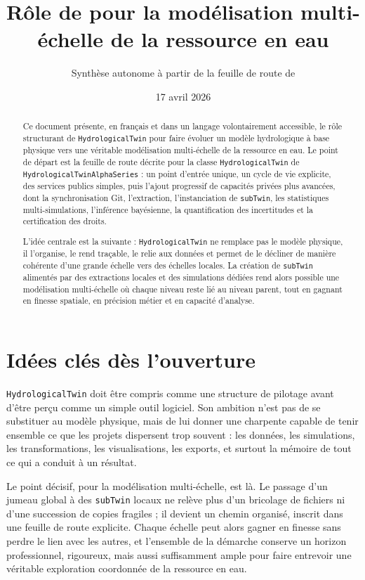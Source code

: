 \documentclass[11pt,a4paper]{article}
\title{Rôle de \hydrot{} pour la modélisation multi-échelle de la ressource en eau}
\author{Synthèse autonome à partir de la feuille de route de \alphaht{}}
\date{17 avril 2026}
\newcommand{\hydrot}{\texttt{HydrologicalTwin}}
\newcommand{\alphaht}{\texttt{HydrologicalTwinAlphaSeries}}
\begin{document}
\maketitle

\begin{abstract}
Ce document présente, en français et dans un langage volontairement accessible, le rôle structurant de \hydrot{} pour faire évoluer un modèle hydrologique à base physique vers une véritable modélisation multi-échelle de la ressource en eau. Le point de départ est la feuille de route décrite pour la classe \texttt{HydrologicalTwin} de \alphaht{} : un point d'entrée unique, un cycle de vie explicite, des services publics simples, puis l'ajout progressif de capacités privées plus avancées, dont la synchronisation Git, l'extraction, l'instanciation de \texttt{subTwin}, les statistiques multi-simulations, l'inférence bayésienne, la quantification des incertitudes et la certification des droits.

L'idée centrale est la suivante : \hydrot{} ne remplace pas le modèle physique, il l'organise, le rend traçable, le relie aux données et permet de le décliner de manière cohérente d'une grande échelle vers des échelles locales. La création de \texttt{subTwin} alimentés par des extractions locales et des simulations dédiées rend alors possible une modélisation multi-échelle où chaque niveau reste lié au niveau parent, tout en gagnant en finesse spatiale, en précision métier et en capacité d'analyse.
\end{abstract}

\section*{Idées clés dès l'ouverture}

\hydrot{} doit être compris comme une structure de pilotage avant d'être perçu comme un simple outil logiciel. Son ambition n'est pas de se substituer au modèle physique, mais de lui donner une charpente capable de tenir ensemble ce que les projets dispersent trop souvent : les données, les simulations, les transformations, les visualisations, les exports, et surtout la mémoire de tout ce qui a conduit à un résultat.

Le point décisif, pour la modélisation multi-échelle, est là. Le passage d'un jumeau global à des \texttt{subTwin} locaux ne relève plus d'un bricolage de fichiers ni d'une succession de copies fragiles ; il devient un chemin organisé, inscrit dans une feuille de route explicite. Chaque échelle peut alors gagner en finesse sans perdre le lien avec les autres, et l'ensemble de la démarche conserve un horizon professionnel, rigoureux, mais aussi suffisamment ample pour faire entrevoir une véritable exploration coordonnée de la ressource en eau.
\end{document}
